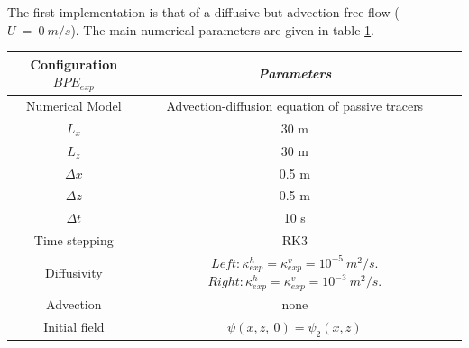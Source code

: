 The first implementation is that of a diffusive but advection-free flow ($U\ =\ 0 \ m/s$). The main numerical parameters are given in table \ref{tab_NUMLAB_exp}.

\begin{table}[h]
        \centering
        \begin{tabular}{|c|c|c|}
                \hline
                Configuration $BPE_{exp}$ & \textit{Parameters}\\
                \hline 
                Numerical Model & Advection-diffusion equation of passive tracers\\
                $L_x$ & 30 m\\
                $L_z$ & 30 m\\
                $\Delta x$ & 0.5 m\\
                $\Delta z$ & 0.5 m\\
                $\Delta t$ & 10 s\\
                Time stepping & RK3 \\
                Diffusivity & $Left: \kappa_{exp}^h=\kappa_{exp}^v=10^{-5}\ m^2/s$. $Right: \kappa_{exp}^h=\kappa_{exp}^v=10^{-3}\ m^2/s$. \\
                Advection & none\\
                Initial field & $\psi(x, z,\ 0)=\psi_2(x,z)$\\
                \hline
        \end{tabular}
        \label{tab_NUMLAB_exp}
\end{table}
